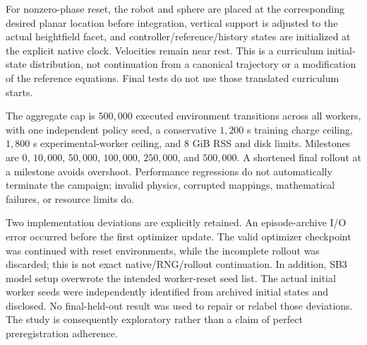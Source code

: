 For nonzero-phase reset, the robot and sphere are placed at the corresponding desired planar location before integration, vertical support is adjusted to the actual heightfield facet, and controller/reference/history states are initialized at the explicit native clock. Velocities remain near rest. This is a curriculum initial-state distribution, not continuation from a canonical trajectory or a modification of the reference equations. Final tests do not use those translated curriculum starts.

The aggregate cap is $500,000$ executed environment transitions across all workers, with one independent policy seed, a conservative $1,200$ s training charge ceiling, $1,800$ s experimental-worker ceiling, and $8$ GiB RSS and disk limits. Milestones are $0$, $10,000$, $50,000$, $100,000$, $250,000$, and $500,000$. A shortened final rollout at a milestone avoids overshoot. Performance regressions do not automatically terminate the campaign; invalid physics, corrupted mappings, mathematical failures, or resource limits do.

Two implementation deviations are explicitly retained. An episode-archive I/O error occurred before the first optimizer update. The valid optimizer checkpoint was continued with reset environments, while the incomplete rollout was discarded; this is not exact native/RNG/rollout continuation. In addition, SB3 model setup overwrote the intended worker-reset seed list. The actual initial worker seeds were independently identified from archived initial states and disclosed. No final-held-out result was used to repair or relabel those deviations. The study is consequently exploratory rather than a claim of perfect preregistration adherence.
